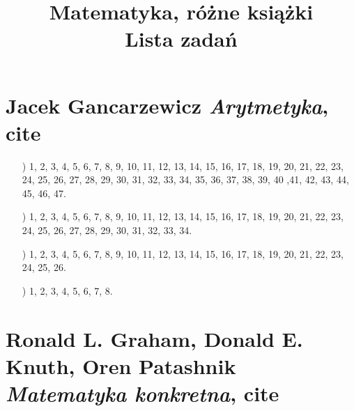 \documentclass[a4paper,11pt]{article}
\title{Matematyka, różne książki \\
  {\Large Lista zadań}}
\numberwithin{equation}{section}
\begin{document}





\maketitle





\section{Jacek Gancarzewicz \textit{Arytmetyka}, cite{}}

\label{sec:Oznaczenia-i-konwencje}


\begin{itemize}

\item[\romannumeral1)] 1, 2, 3, 4, 5, 6, 7, 8, 9, 10, 11, 12, 13, 14, 15,
  16, 17, 18, 19, 20, 21, 22, 23, 24, 25, 26, 27, 28, 29, 30, 31, 32, 33,
  34, 35, 36, 37, 38, 39, 40 ,41, 42, 43, 44, 45, 46, 47.

\item[\romannumeral2)] 1, 2, 3, 4, 5, 6, 7, 8, 9, 10, 11, 12, 13, 14, 15,
  16, 17, 18, 19, 20, 21, 22, 23, 24, 25, 26, 27, 28, 29, 30, 31, 32, 33,
  34.

\item[\romannumeral3)] 1, 2, 3, 4, 5, 6, 7, 8, 9, 10, 11, 12, 13, 14, 15,
  16, 17, 18, 19, 20, 21, 22, 23, 24, 25, 26.

\item[\romannumeral4)] 1, 2, 3, 4, 5, 6, 7, 8.

\end{itemize}










\section{Ronald L. Graham, Donald E. Knuth, Oren Patashnik
  \textit{Matematyka konkretna}, cite{}}

\label{sec:Oznaczenia-i-konwencje}
\end{document}
